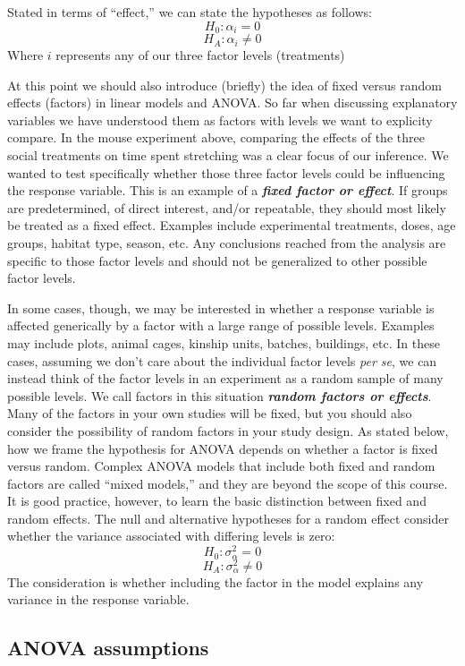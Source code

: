 \documentclass[]{book}
\begin{document}
Stated in terms of ``effect,'' we can state the hypotheses as follows:
\[H_0:\alpha_i=0\]
\[H_A:\alpha_i\neq0\]
Where \(i\) represents any of our three factor levels (treatments)

At this point we should also introduce (briefly) the idea of fixed versus random effects (factors) in linear models and ANOVA. So far when discussing explanatory variables we have understood them as factors with levels we want to explicity compare. In the mouse experiment above, comparing the effects of the three social treatments on time spent stretching was a clear focus of our inference. We wanted to test specifically whether those three factor levels could be influencing the response variable. This is an example of a \textbf{\emph{fixed factor or effect}}. If groups are predetermined, of direct interest, and/or repeatable, they should most likely be treated as a fixed effect. Examples include experimental treatments, doses, age groups, habitat type, season, etc. Any conclusions reached from the analysis are specific to those factor levels and should not be generalized to other possible factor levels.

In some cases, though, we may be interested in whether a response variable is affected generically by a factor with a large range of possible levels. Examples may include plots, animal cages, kinship units, batches, buildings, etc. In these cases, assuming we don't care about the individual factor levels \emph{per se}, we can instead think of the factor levels in an experiment as a random sample of many possible levels. We call factors in this situation \textbf{\emph{random factors or effects}}. Many of the factors in your own studies will be fixed, but you should also consider the possibility of random factors in your study design. As stated below, how we frame the hypothesis for ANOVA depends on whether a factor is fixed versus random. Complex ANOVA models that include both fixed and random factors are called ``mixed models,'' and they are beyond the scope of this course. It is good practice, however, to learn the basic distinction between fixed and random effects. The null and alternative hypotheses for a random effect consider whether the variance associated with differing levels is zero:
\[H_0:\sigma_{\alpha}^2=0\]
\[H_A:\sigma_{\alpha}^2\neq0\]
The consideration is whether including the factor in the model explains any variance in the response variable.

\hypertarget{anova-assumptions}{%
\subsection{ANOVA assumptions}\label{anova-assumptions}}
\end{document}
